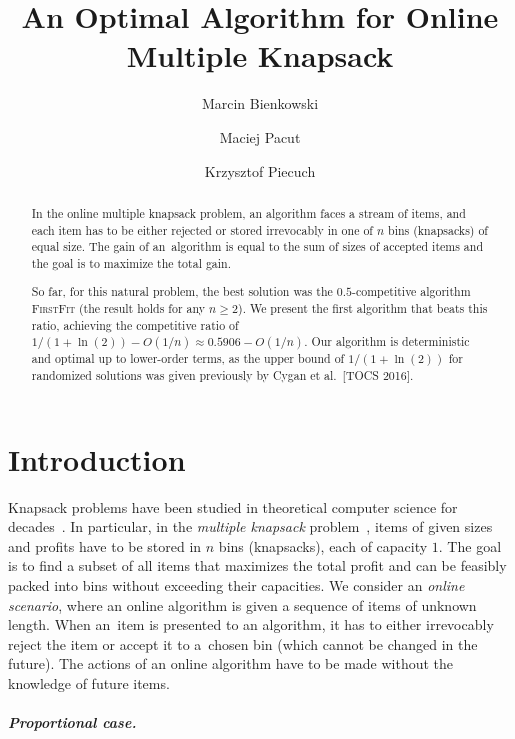 \documentclass[a4paper,USenglish,cleveref]{lipics-v2019}
\title{An Optimal Algorithm for Online Multiple Knapsack}
\author{Marcin Bienkowski}{Institute of Computer Science, University of Wroc{\l}aw, Poland}{marcin.bienkowski@cs.uni.wroc.pl}{https://orcid.org/0000-0002-2453-7772}{}
\author{Maciej Pacut}{Faculty of Computer Science, University of Vienna, Austria}{maciej.pacut@univie.ac.at}{https://orcid.org/0000-0002-6379-1490}{}
\author{Krzysztof Piecuch}{Institute of Computer Science, University of Wroc{\l}aw, Poland}{kpiecuch@cs.uni.wroc.pl}{}{}
\begin{document}
\maketitle

\begin{abstract}
In the online multiple knapsack problem, an algorithm faces a stream of items,
and each item has to be either rejected or stored irrevocably in one of $n$ bins
(knapsacks) of equal size. The gain of an~algorithm is equal to the sum of sizes
of accepted items and the goal is to maximize the total gain.

So far, for this natural problem, the best solution was the $0.5$-competitive
algorithm \textsc{FirstFit} (the result holds for any $n \geq 2$). We present
the first algorithm that beats this ratio, achieving the competitive ratio of
$1/(1+\ln(2))-O(1/n) \approx 0.5906 - O(1/n)$. Our algorithm is deterministic
and optimal up to lower-order terms, as the upper bound of $1/(1+\ln(2))$ for
randomized solutions was given previously by Cygan et al.~[TOCS 2016]. 
\end{abstract}


\section{Introduction}
\label{sec:introduction}

Knapsack problems have been studied in theoretical computer science for
decades~\cite{Keller16,KePfPi04}. In particular, in the
\emph{multiple knapsack} 
problem~\cite{ABFLNE02,BoFaLN01,CheKha05,CyJeSg16,IwaTak02,Keller99,Pising99},
items of given sizes and profits have to be stored in $n$ bins (knapsacks), each
of capacity $1$. The goal is to find a subset of all items that maximizes the
total profit and can be feasibly packed into bins without exceeding their
capacities. We consider an \emph{online scenario}, where an online algorithm is
given a sequence of items of unknown length. When an~item is presented to an
algorithm, it has to either irrevocably reject the item or accept it to a~chosen
bin (which cannot be changed in the future). The actions of an online algorithm
have to be made without the knowledge of future items.

\subparagraph{Proportional case.}
\end{document}
